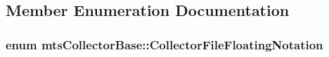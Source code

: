 \subsection{Member Enumeration Documentation}
\hypertarget{classmts_collector_base_ad5d486fde9f8105e4de551d00026ea93}{
\subsubsection[{Collector\-File\-Floating\-Notation}]{\setlength{\rightskip}{0pt plus 5cm}enum {\bf mts\-Collector\-Base\-::\-Collector\-File\-Floating\-Notation}}}\label{classmts_collector_base_ad5d486fde9f8105e4de551d00026ea93}
